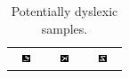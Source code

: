 \begin{table}[htbp]
    \centering
    \begin{tabular}{ccc}
        \includegraphics[width=0.3\textwidth]{./appendices/images/e.png} & \includegraphics[width=0.3\textwidth]{./appendices/images/k.png} & \includegraphics[width=0.3\textwidth]{./appendices/images/z.png} \\
    \end{tabular}
    \caption{Potentially dyslexic samples.}
    \label{fig:pot-dys}
\end{table}